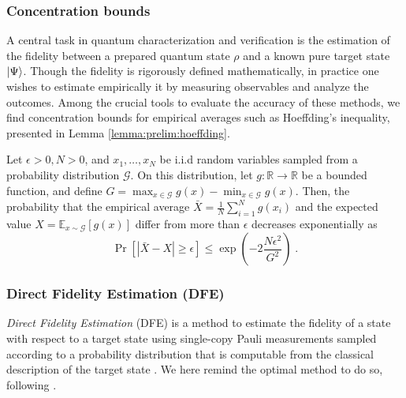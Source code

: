 \documentclass[a4paper,twocolumn,11pt,unpublished]{quantumarticle}
\newcommand{\dist}{\mathcal G} %
\newcommand{\abs}[1]{\left|#1\right|}
\begin{document}
\subsubsection{Concentration bounds}
\label{subsection:prelim:concentration}
A central task in quantum characterization and verification is the estimation of the fidelity between a prepared quantum state $\rho$ and a known pure target state $\ket{\Psi}$. Though the fidelity is rigorously defined mathematically, in practice one wishes to estimate empirically it by measuring observables and analyze the outcomes. Among the crucial tools to evaluate the accuracy of these methods, we find concentration bounds for empirical averages such as Hoeffding's inequality, presented in Lemma \ref{lemma:prelim:hoeffding}.
\begin{lemma}
\label{lemma:prelim:hoeffding}
    Let $\epsilon>0, N>0$, and
    $x_1, \ldots, x_N$ be i.i.d random variables sampled from a probability distribution $\dist$. On this distribution, let $g:\mathbb R \rightarrow \mathbb R$ be a bounded function, and define $G = \max_{x\in\dist}g(x)-\min_{x\in\dist}g(x)$. Then, the probability that the empirical average $\bar X = \frac 1 N \sum_{i=1}^N g(x_{i})$ and the expected value $X=\mathbb E_{x\sim\dist}[g(x)]$ differ from more than  $\epsilon$ decreases exponentially as 
    \begin{equation}
        \Pr\left[
        \abs{
        \bar X
        -
        X
        }
        \geq \epsilon
        \right]
        \leq 
        \exp{
        \left(
        -2\dfrac{N\epsilon^2}{G^2}
        \right)
        }\; .
    \end{equation}
\end{lemma}

\subsubsection{Direct Fidelity Estimation (DFE)}
\label{subsection:prelims:DFE}


\emph{Direct Fidelity Estimation} (DFE) is a method to estimate the fidelity of a state with respect to a target state using single-copy Pauli measurements sampled according to a probability distribution that is computable from the classical description of the target state \cite{FL11direct}. We here remind the optimal method to do so, following \cite{FOS24optimal}.
\end{document}

